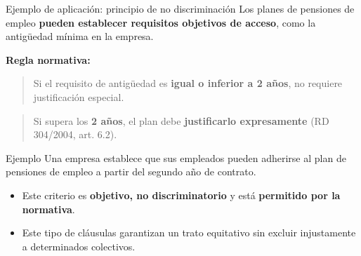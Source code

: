 \documentclass[
  ignorenonframetext,
  aspectratio=54,
  spanish,
]{beamer}
\begin{document}
\begin{frame}{Ejemplo de aplicación: principio de no discriminación}
\label{ejemplo-de-aplicaciuxf3n-principio-de-no-discriminaciuxf3n}
Los planes de pensiones de empleo \textbf{pueden establecer requisitos
objetivos de acceso}, como la antigüedad mínima en la empresa.

\begin{block}{\textbf{Regla normativa:}}
\label{regla-normativa}
\begin{quote}
Si el requisito de antigüedad es \textbf{igual o inferior a 2 años}, no
requiere justificación especial.
\end{quote}

\begin{quote}
Si supera los \textbf{2 años}, el plan debe \textbf{justificarlo
expresamente} (RD 304/2004, art. 6.2).
\end{quote}
\end{block}

\begin{block}{Ejemplo}
\label{ejemplo}
Una empresa establece que sus empleados pueden adherirse al plan de
pensiones de empleo a partir del segundo año de contrato.

\begin{itemize}
\item
  Este criterio es \textbf{objetivo, no discriminatorio} y está
  \textbf{permitido por la normativa}.
\item
  Este tipo de cláusulas garantizan un trato equitativo sin excluir
  injustamente a determinados colectivos.
\end{itemize}
\end{block}
\end{frame}
\end{document}
